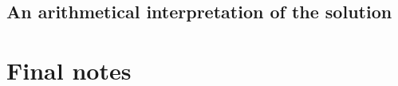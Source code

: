 \documentclass[11pt]{article}
\begin{document}

\hypertarget{arithmetical-interpretation} {
	\subsection{An arithmetical interpretation of the solution}
	\label{arithmetical-interpretation}
}


\hypertarget{final-notes}{
	\section{Final notes}
	\label{final-notes}
}
\end{document}

